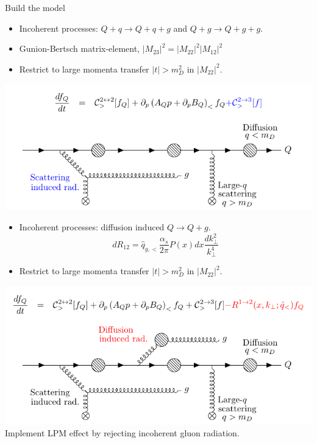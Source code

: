 \documentclass[11pt]{beamer}
\begin{document}
\begin{frame}{Build the model}
\begin{overprint}
\vspace{1cm}
\begin{itemize}
\item Incoherent processes: $Q+q\rightarrow Q+q+g$ and $Q+g\rightarrow Q+g+g$.
\item Gunion-Bertsch matrix-element, $|M_{23}|^2 = |M_{22}|^2 |M_{12}|^2$
\item Restrict to large momenta transfer $|t| > m_D^2$ in $|M_{22}|^2$.
\end{itemize}
\includegraphics[width=.9\textwidth]{22-11-23.pdf}
\vspace{.5cm}
\begin{itemize}
\item Incoherent processes: diffusion induced $Q \rightarrow Q+g$.
\vspace{-.25cm}
\begin{equation}
\nonumber
dR_{12} = \hat{q}_{g,<} \frac{\alpha_s}{2\pi}P(x)dx \frac{dk_\perp^2}{k_\perp^4}
\end{equation} 
\vspace{-.5cm}
\item Restrict to large momenta transfer $|t| > m_D^2$ in $|M_{22}|^2$.
\end{itemize}
\includegraphics[width=.9\textwidth]{22-11-23-12.pdf}
Implement LPM effect by rejecting incoherent gluon radiation.\\

\end{overprint}
\end{frame}
\end{document}
